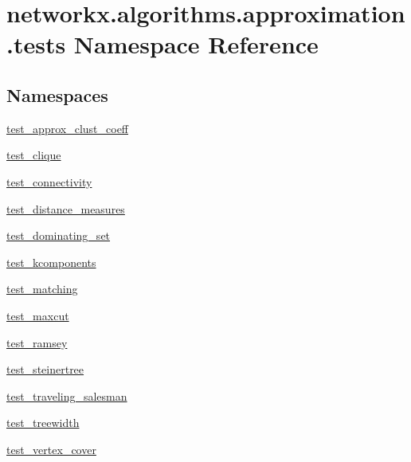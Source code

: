 \hypertarget{namespacenetworkx_1_1algorithms_1_1approximation_1_1tests}{}\section{networkx.\+algorithms.\+approximation.\+tests Namespace Reference}
\label{namespacenetworkx_1_1algorithms_1_1approximation_1_1tests}
\subsection*{Namespaces}
\begin{DoxyCompactItemize}
\item 
 \hyperlink{namespacenetworkx_1_1algorithms_1_1approximation_1_1tests_1_1test__approx__clust__coeff}{test\+\_\+approx\+\_\+clust\+\_\+coeff}
\item 
 \hyperlink{namespacenetworkx_1_1algorithms_1_1approximation_1_1tests_1_1test__clique}{test\+\_\+clique}
\item 
 \hyperlink{namespacenetworkx_1_1algorithms_1_1approximation_1_1tests_1_1test__connectivity}{test\+\_\+connectivity}
\item 
 \hyperlink{namespacenetworkx_1_1algorithms_1_1approximation_1_1tests_1_1test__distance__measures}{test\+\_\+distance\+\_\+measures}
\item 
 \hyperlink{namespacenetworkx_1_1algorithms_1_1approximation_1_1tests_1_1test__dominating__set}{test\+\_\+dominating\+\_\+set}
\item 
 \hyperlink{namespacenetworkx_1_1algorithms_1_1approximation_1_1tests_1_1test__kcomponents}{test\+\_\+kcomponents}
\item 
 \hyperlink{namespacenetworkx_1_1algorithms_1_1approximation_1_1tests_1_1test__matching}{test\+\_\+matching}
\item 
 \hyperlink{namespacenetworkx_1_1algorithms_1_1approximation_1_1tests_1_1test__maxcut}{test\+\_\+maxcut}
\item 
 \hyperlink{namespacenetworkx_1_1algorithms_1_1approximation_1_1tests_1_1test__ramsey}{test\+\_\+ramsey}
\item 
 \hyperlink{namespacenetworkx_1_1algorithms_1_1approximation_1_1tests_1_1test__steinertree}{test\+\_\+steinertree}
\item 
 \hyperlink{namespacenetworkx_1_1algorithms_1_1approximation_1_1tests_1_1test__traveling__salesman}{test\+\_\+traveling\+\_\+salesman}
\item 
 \hyperlink{namespacenetworkx_1_1algorithms_1_1approximation_1_1tests_1_1test__treewidth}{test\+\_\+treewidth}
\item 
 \hyperlink{namespacenetworkx_1_1algorithms_1_1approximation_1_1tests_1_1test__vertex__cover}{test\+\_\+vertex\+\_\+cover}
\end{DoxyCompactItemize}
